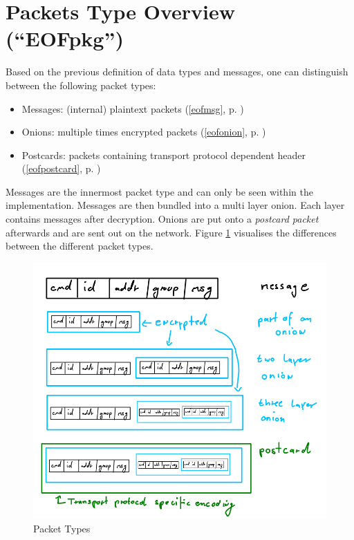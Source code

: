 \section{Packets Type Overview ("`EOFpkg"')}
\label{eofpkg}
Based on the previous definition of data types and messages, one
can distinguish between the following packet types:
\begin{itemize}
\item Messages: (internal) plaintext packets (\ref{eofmsg}, p. \pageref{eofmsg})
\item Onions: multiple times encrypted packets (\ref{eofonion}, p. \pageref{eofonion})
\item Postcards: packets containing transport protocol dependent header (\ref{eofpostcard}, p. \pageref{eofpostcard})
\end{itemize}
Messages are the innermost packet type and can only be seen within
the implementation.
Messages are then bundled into a multi layer onion. 
Each layer contains messages after decryption.
Onions are put onto a \textit{postcard packet} 
afterwards and are sent out on the network.
Figure \ref{packettypes} visualises the differences between the 
different packet types.
\begin{figure}
    \centering
    \caption{Packet Types}
    \label{packettypes}
    \includegraphics[scale=0.8]{packet-types.png}
\end{figure}
